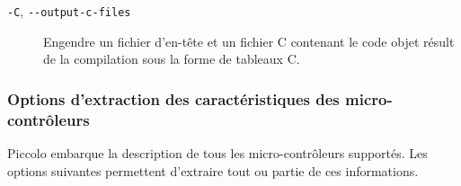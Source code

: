 \begin{description}
  \item[\texttt{-C}, \texttt{-{-}output-c-files}] Engendre un fichier d'en-tête et un fichier C contenant le code objet résult de la compilation sous la forme de tableaux C.

\end{description}



\subsubsection{Options d'extraction des caractéristiques des micro-contrôleurs}

Piccolo embarque la description de tous les micro-contrôleurs supportés. Les options suivantes permettent d'extraire tout ou partie de ces informations.

